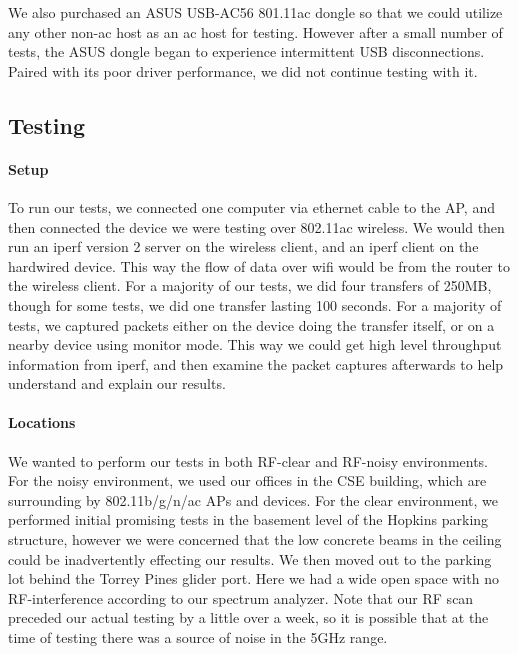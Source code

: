 We also purchased an ASUS USB-AC56 801.11ac dongle so that we could
utilize any other non-ac host as an ac host for testing. However after
a small number of tests, the ASUS dongle began to experience
intermittent USB disconnections. Paired with its poor driver
performance, we did not continue testing with it.

\subsection{Testing}

\paragraph{Setup}
To run our tests, we connected one computer via ethernet cable to the AP, and
then connected the device we were testing over 802.11ac wireless. We would then
run an iperf version 2 server on the wireless client, and
an iperf client on the hardwired device. This way the flow of data over wifi
would be from the router to the wireless client. For a majority of our tests, we
did four transfers of 250MB, though for some tests, we did one transfer lasting
100 seconds. For a majority of tests, we captured packets either on the device
doing the transfer itself, or on a nearby device using monitor mode. This way
we could get high level throughput information from iperf, and then examine the
packet captures afterwards to help understand and explain our results.

\paragraph{Locations}
We wanted to perform our tests in both RF-clear and RF-noisy
environments. For the noisy environment, we used our offices in the
CSE building, which are surrounding by 802.11b/g/n/ac APs and
devices. For the clear environment, we performed initial promising
tests in the basement level of the Hopkins parking structure, however
we were concerned that the low concrete beams in the ceiling could be
inadvertently effecting our results. We then moved out to the parking
lot behind the Torrey Pines glider port. Here we had a wide open space
with no RF-interference according to our spectrum analyzer. Note that
our RF scan preceded our actual testing by a little over a week, so
it is possible that at the time of testing there was a source of noise
in the 5GHz range.


